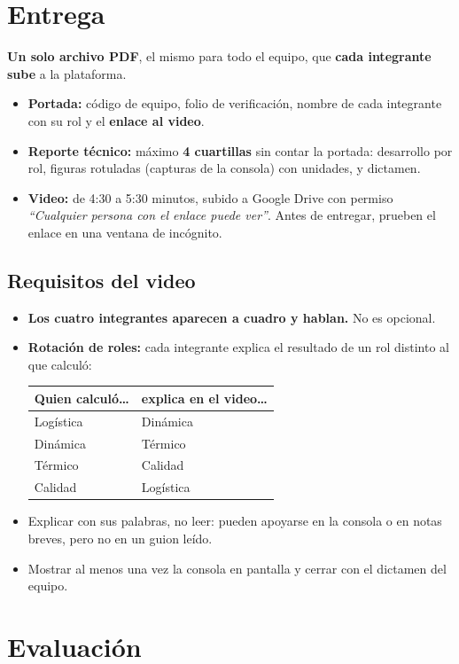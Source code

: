 \documentclass[11pt,letterpaper]{article}
\newcommand{\dest}[1]{\textcolor{accentcolor}{\textbf{#1}}}
\begin{document}
\section{Entrega}
\textbf{Un solo archivo PDF}, el mismo para todo el equipo, que \textbf{cada integrante sube} a la plataforma.
\begin{itemize}
\item \textbf{Portada:} código de equipo, folio de verificación, nombre de cada integrante con su rol y el \textbf{enlace al video}.
\item \textbf{Reporte técnico:} máximo \textbf{4 cuartillas} sin contar la portada: desarrollo por rol, figuras rotuladas (capturas de la consola) con unidades, y dictamen.
\item \textbf{Video:} de 4:30 a 5:30 minutos, subido a Google Drive con permiso \emph{``Cualquier persona con el enlace puede ver''}. Antes de entregar, prueben el enlace en una ventana de incógnito.
\end{itemize}

\subsection*{Requisitos del video}
\begin{itemize}
\item \dest{Los cuatro integrantes aparecen a cuadro y hablan.} No es opcional.
\item \textbf{Rotación de roles:} cada integrante explica el resultado de un rol distinto al que calculó:
\begin{center}\small
\begin{tabular}{@{}ll@{}}\toprule
Quien calculó\ldots & explica en el video\ldots \\ \midrule
Logística & Dinámica \\ Dinámica & Térmico \\ Térmico & Calidad \\ Calidad & Logística \\ \bottomrule
\end{tabular}\end{center}
\item Explicar con sus palabras, no leer: pueden apoyarse en la consola o en notas breves, pero no en un guion leído.
\item Mostrar al menos una vez la consola en pantalla y cerrar con el dictamen del equipo.
\end{itemize}

\section{Evaluación}
\end{document}
